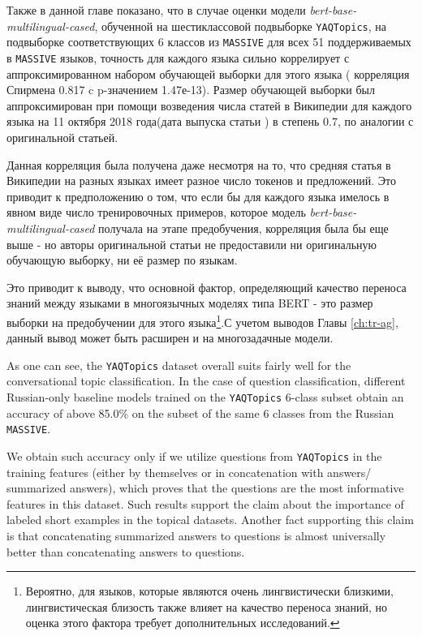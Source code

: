 Также в данной главе показано, что в случае оценки модели  \textit{bert-base-multilingual-cased}, обученной на шестиклассовой подвыборке \texttt{YAQTopics}, на подвыборке соответствующих 6 классов из \texttt{MASSIVE} для всех 51 поддерживаемых в \texttt{MASSIVE} языков, точность для каждого языка сильно коррелирует с аппроксимированном набором обучающей выборки для этого языка ( корреляция Спирмена 0.817 c p-значением 1.47е-13). Размер обучающей выборки был аппроксимирован при помощи возведения числа статей в Википедии для каждого языка на 11 октября 2018 года(дата выпуска статьи \cite{bert}) в степень 0.7, по аналогии с оригинальной статьей. 

Данная корреляция была получена даже несмотря на то, что средняя статья в Википедии на разных языках имеет разное число токенов и предложений. Это приводит к предположению о том, что если бы для каждого языка имелось в явном виде число тренировочных примеров, которое модель \textit{bert-base-multilingual-cased} получала на этапе предобучения, корреляция была бы еще выше - но авторы оригинальной статьи не предоставили ни оригинальную обучающую выборку, ни её размер по языкам. 

Это приводит к выводу, что основной фактор, определяющий качество переноса знаний между языками в многоязычных моделях типа BERT - это размер выборки на предобучении для этого языка\footnote{Вероятно, для языков, которые являются очень лингвистически близкими, лингвистическая близость также влияет на качество переноса знаний, но оценка этого фактора требует дополнительных исследований.}.С учетом выводов Главы \ref{ch:tr-ag}, данный вывод может быть расширен и на многозадачные модели. 

As one can see, the \texttt{YAQTopics} dataset overall suits fairly well for the conversational topic classification. In the case of question classification, different Russian-only baseline models trained on the \texttt{YAQTopics} 6-class subset obtain an accuracy of above 85.0\% on the subset of the same 6 classes from the Russian  \texttt{MASSIVE}. 

We obtain such accuracy only if we utilize questions from \texttt{YAQTopics} in the training features (either by themselves or in concatenation with answers/ summarized answers), which proves that the questions are the most informative features in this dataset. Such results support the claim about the importance of labeled short examples in the topical datasets. Another fact supporting this claim is that concatenating summarized answers to questions is almost universally better than concatenating answers to questions.

